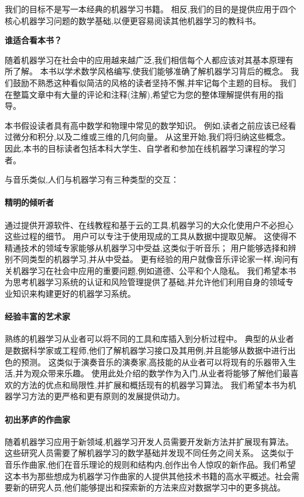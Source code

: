 我们的目标不是写一本经典的机器学习书籍。 
相反,我们的目的是提供应用于四个核心机器学习问题的数学基础,以便更容易阅读其他机器学习的教科书。

\begin{center}
	\textbf{谁适合看本书？}
\end{center}

随着机器学习在社会中的应用越来越广泛,我们相信每个人都应该对其基本原理有所了解。
本书以学术数学风格编写,使我们能够准确了解机器学习背后的概念。
我们鼓励不熟悉这种看似简洁的风格的读者坚持不懈,并牢记每个主题的目标。
我们在整篇文章中有大量的评论和注释(注解),希望它为您的整体理解提供有用的指导。

本书假设读者具有高中数学和物理中常见的数学知识。
例如,读者之前应该已经看过微分和积分,以及二维或三维的几何向量。
从这里开始,我们将归纳这些概念。
因此,本书的目标读者包括本科大学生、自学者和参加在线机器学习课程的学习者。

与音乐类似,人们与机器学习有三种类型的交互：

\paragraph{精明的倾听者} 通过提供开源软件、在线教程和基于云的工具,机器学习的大众化使用户不必担心这些过程的细节。 用户可以专注于使用现成的工具从数据中提取见解。 这使得不精通技术的领域专家能够从机器学习中受益,这类似于听音乐； 用户能够选择和辨别不同类型的机器学习,并从中受益。 更有经验的用户就像音乐评论家一样,询问有关机器学习在社会中应用的重要问题,例如道德、公平和个人隐私。 我们希望本书为思考机器学习系统的认证和风险管理提供了基础,并允许他们利用自身的领域专业知识来构建更好的机器学习系统。

\paragraph{经验丰富的艺术家} 熟练的机器学习从业者可以将不同的工具和库插入到分析过程中。 典型的从业者是数据科学家或工程师,他们了解机器学习接口及其用例,并且能够从数据中进行出色的预测。 这类似于演奏音乐的演奏家,高技能的从业者可以将现有的乐器带入生活,并为观众带来乐趣。 使用此处介绍的数学作为入门,从业者将能够了解他们最喜欢的方法的优点和局限性,并扩展和概括现有的机器学习算法。 我们希望本书为机器学习方法的更严格和更有原则的发展提供动力。

\paragraph{初出茅庐的作曲家} 随着机器学习应用于新领域,机器学习开发人员需要开发新方法并扩展现有算法。 这些研究人员需要了解机器学习的数学基础并发现不同任务之间关系。 这类似于音乐作曲家,他们在音乐理论的规则和结构内,创作出令人惊叹的新作品。我们希望这本书为那些想成为机器学习作曲家的人提供其他技术书籍的高水平概述。社会需要新的研究人员,他们能够提出和探索新的方法来应对数据学习中的更多挑战。

